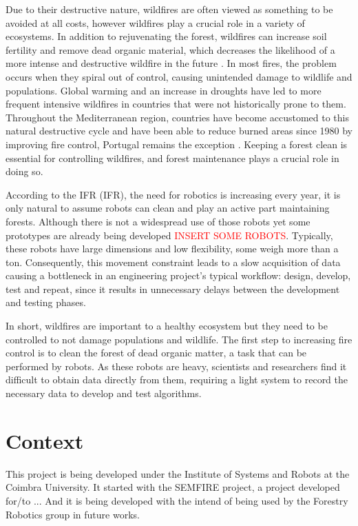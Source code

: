 Due to their destructive nature, wildfires are often viewed as something to be avoided at all costs, however wildfires play a crucial role in a variety of ecosystems. In addition to rejuvenating the forest, wildfires can increase soil fertility and remove dead organic material, which decreases the likelihood of a more intense and destructive wildfire in the future \cite{bond_fires_2017}. In most fires, the problem occurs when they spiral out of control, causing unintended damage to wildlife and populations. Global warming and an increase in droughts have led to more frequent intensive wildfires in countries that were not historically prone to them. Throughout the Mediterranean region, countries have become accustomed to this natural destructive cycle and have been able to reduce burned areas since 1980 by improving fire control, Portugal remains the exception \cite{turco_decreasing_2016}\cite{european_commission_joint_research_centre_forest_2021}. Keeping a forest clean is essential for controlling wildfires, and forest maintenance plays a crucial role in doing so.

According to the \acl{IFR} (\acs{IFR}), the need for robotics is increasing every year, it is only natural to assume robots can clean and play an active part maintaining forests. Although there is not a widespread use of those robots yet some prototypes are already being developed \textcolor{red}{INSERT SOME ROBOTS}. Typically, these robots have large dimensions and low flexibility, some weigh more than a ton. Consequently, this movement constraint leads to a slow acquisition of data causing a bottleneck in an engineering project's typical workflow: design, develop, test and repeat, since it results in unnecessary delays between the development and testing phases.

In short, wildfires are important to a healthy ecosystem but they need to be controlled to not damage populations and wildlife. The first step to increasing fire control is to clean the forest of dead organic matter, a task that can be performed by robots. As these robots are heavy, scientists and researchers find it difficult to obtain data directly from them, requiring a light system to record the necessary data to develop and test algorithms.

\section{Context}

This project is being developed under the Institute of Systems and Robots at the Coimbra University. It started with the SEMFIRE project, a project developed for/to ... And it is being developed with the intend of being used by the Forestry Robotics group in future works.

